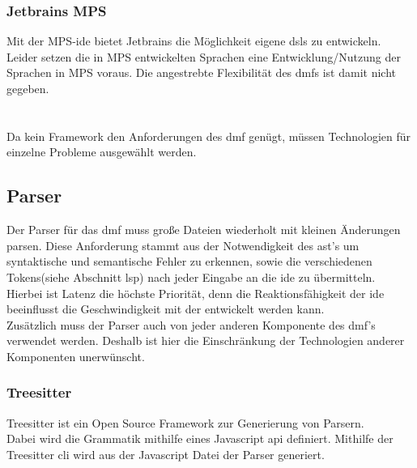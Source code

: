 \documentclass[./einleitung.tex]{subfiles}
\begin{document}
\subsubsection{Jetbrains MPS}
Mit der MPS-\acrshort{ide} bietet Jetbrains die Möglichkeit eigene \acrshort{dsl}s zu entwickeln.\\
Leider setzen die in MPS entwickelten Sprachen eine Entwicklung/Nutzung der Sprachen in MPS voraus.
Die angestrebte Flexibilität des \acrshort{dmf}s ist damit nicht gegeben.
\\\\\\
Da kein Framework den Anforderungen des \acrshort{dmf} genügt, müssen Technologien für einzelne Probleme ausgewählt werden.
\subsection{Parser}
Der Parser für das \acrshort{dmf} muss große Dateien wiederholt mit kleinen Änderungen parsen.
Diese Anforderung stammt aus der Notwendigkeit des \acrshort{ast}'s um syntaktische und semantische Fehler zu erkennen, sowie die verschiedenen Tokens(siehe Abschnitt \acrshort{lsp}) nach jeder Eingabe an die \acrshort{ide} zu übermitteln.
Hierbei ist Latenz die höchste Priorität, denn die Reaktionsfähigkeit der \acrshort{ide} beeinflusst die Geschwindigkeit mit der entwickelt werden kann. \\
Zusätzlich muss der Parser auch von jeder anderen Komponente des \acrshort{dmf}'s verwendet werden.
Deshalb ist hier die Einschränkung der Technologien anderer Komponenten unerwünscht.

\subsubsection{Treesitter}
Treesitter ist ein Open Source Framework zur Generierung von Parsern.\\
Dabei wird die Grammatik mithilfe eines Javascript \acrlong{api} definiert.
Mithilfe der Treesitter \acrlong{cli} wird aus der Javascript Datei der Parser generiert. \\
\end{document}
